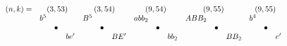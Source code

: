 \documentclass{article}
\begin{document}
\(
\begin{array}{crclrclrclrclrclrclrclrcl}
  (n,k)= & \multicolumn{3}{c}{(3,53)} & \multicolumn{3}{c}{(3,54)} & \multicolumn{3}{c}{(9,54)} & \multicolumn{3}{c}{(9,55)} & \multicolumn{3}{c}{(9,55)} & & &  \\
  & b^5 & & & B^5 & & & abb_2 & & & ABB_2 & & & b^4 & & & & & & & & & & & \\
  & & \bullet & & & \bullet & & & \bullet & & & \bullet & & & \bullet & & & & & & & & & & \\
  & & & be' & & & BE' & & & bb_2& & & BB_2 & & & e' & & & & & & & & & 
\end{array}
\)\\
\end{document}
